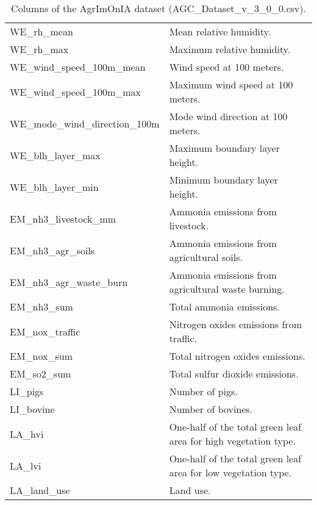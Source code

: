\documentclass[11pt,a4paper]{article}
\begin{document}
\begin{table}[H]
\begin{tabular}{|l|l|}
        WE\_rh\_mean                    & Mean relative humidity.                                         \\
        WE\_rh\_max                     & Maximum relative humidity.                                      \\
        WE\_wind\_speed\_100m\_mean     & Wind speed at 100 meters.                                       \\
        WE\_wind\_speed\_100m\_max      & Maximum wind speed at 100 meters.                               \\
        WE\_mode\_wind\_direction\_100m & Mode wind direction at 100 meters.                              \\
        WE\_blh\_layer\_max             & Maximum boundary layer height.                                  \\ %
        WE\_blh\_layer\_min             & Minimum boundary layer height.                                  \\ %
        EM\_nh3\_livestock\_mm          & Ammonia emissions from livestock.                               \\
        EM\_nh3\_agr\_soils             & Ammonia emissions from agricultural soils.                      \\
        EM\_nh3\_agr\_waste\_burn       & Ammonia emissions from agricultural waste burning.              \\
        EM\_nh3\_sum                    & Total ammonia emissions.                                        \\
        EM\_nox\_traffic                & Nitrogen oxides emissions from traffic.                         \\
        EM\_nox\_sum                    & Total nitrogen oxides emissions.                                \\
        EM\_so2\_sum                    & Total sulfur dioxide emissions.                                 \\
        LI\_pigs                        & Number of pigs.                                                 \\
        LI\_bovine                      & Number of bovines.                                              \\
        LA\_hvi                         & One-half of the total green leaf area for high vegetation type. \\ %
        LA\_lvi                         & One-half of the total green leaf area for low vegetation type.  \\ %
        LA\_land\_use                   & Land use.                                                       \\
        \hline
    \end{tabular}
    \caption{Columns of the AgrImOnIA dataset (AGC\_Dataset\_v\_3\_0\_0.csv).}
    \label{tab:agc_dataset}
\end{table}
\end{document}
